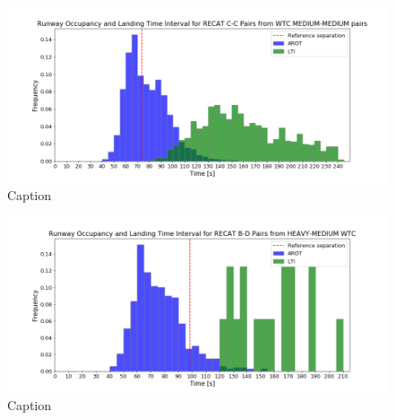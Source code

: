 \begin{figure}
    \centering
    \includegraphics[width=1\textwidth]{graphics/fig_CC_from_MM_pairs_time_sep.png}
    \caption[list of figures caption]{Caption}
    \label{fig:CC_from_MM_pairs_time_sep}
\end{figure}

\begin{figure}
    \centering
    \includegraphics[width=1\textwidth]{graphics/fig_BD_from_HM_pairs_time_sep.png}
    \caption[list of figures caption]{Caption}
    \label{fig:BD_from_HM_pairs_time_sep}
\end{figure}








